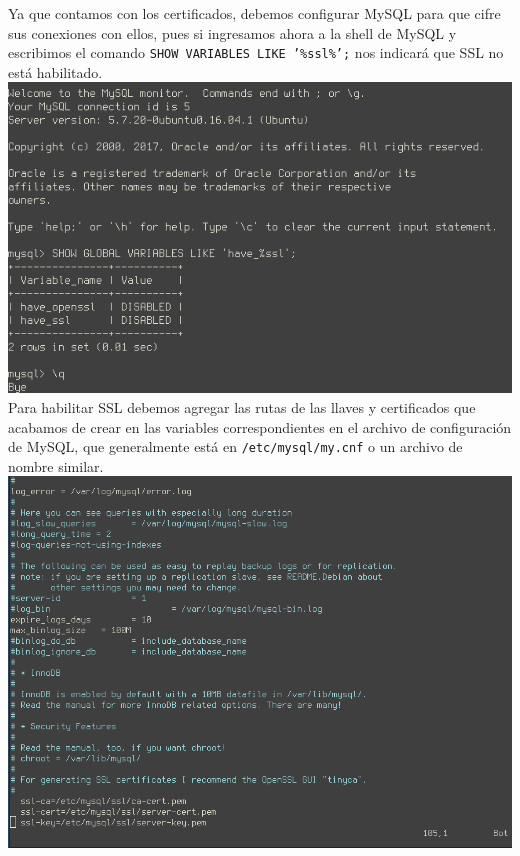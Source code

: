 \documentclass[12pt]{article}
\begin{document}
Ya que contamos con los certificados, debemos configurar \textsf{MySQL} para que cifre sus conexiones con ellos, pues si ingresamos ahora a la shell de \textsf{MySQL} y escribimos el comando \texttt{SHOW VARIABLES LIKE '\%ssl\%';} nos indicará que \textsf{SSL} no está habilitado. \\
\includegraphics[width=\textwidth]{mysql_ssl-disabled} \\

Para habilitar \textsf{SSL} debemos agregar las rutas de las llaves y certificados que acabamos de crear en las variables correspondientes en el archivo de configuración de \textsf{MySQL}, que generalmente está en \texttt{/etc/mysql/my.cnf} o un archivo de nombre similar. \\
\includegraphics[width=\textwidth]{mysql_conf-ssl}\\
\end{document}
